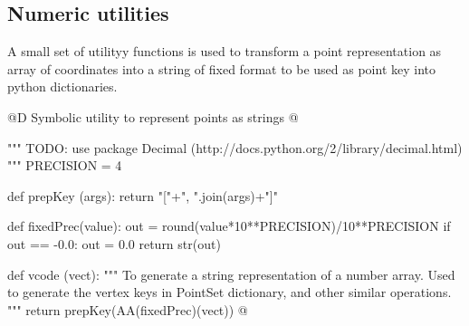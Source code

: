 \documentclass[11pt,oneside]{article}	%
\begin{document}
\subsection{Numeric utilities}

A small set of utilityy functions is used to transform a point representation as array of coordinates into a string of fixed format to be used as point key into python dictionaries.

@D Symbolic utility to represent points as strings
@{""" TODO: use package Decimal (http://docs.python.org/2/library/decimal.html) """
PRECISION = 4 

def prepKey (args): return "["+", ".join(args)+"]"

def fixedPrec(value):
	out = round(value*10**PRECISION)/10**PRECISION
	if out == -0.0: out = 0.0
	return str(out)
	
def vcode (vect): 
	"""
	To generate a string representation of a number array.
	Used to generate the vertex keys in PointSet dictionary, and other similar operations.
	"""
	return prepKey(AA(fixedPrec)(vect))
@}




\end{document}

